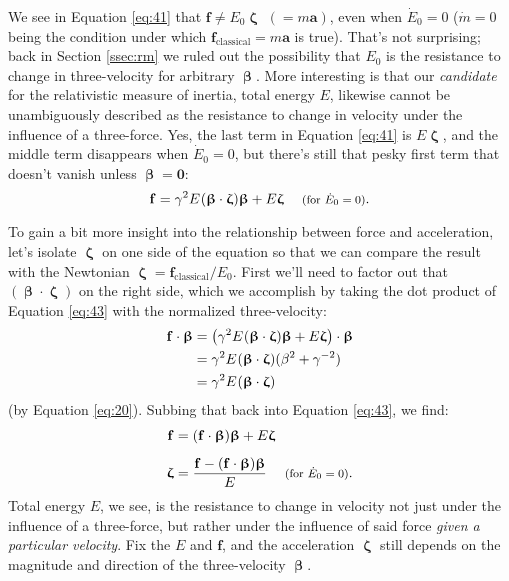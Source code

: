\documentclass[12pt]{article}
\renewcommand{\vv}[1]{\mathbf{#1}}
\newcommand{\vvbeta}{\bm{\upbeta}}
\newcommand{\vvzeta}{\bm{\upzeta}}
\begin{document}
We see in Equation \ref{eq:41} that $\vv f \neq E_0 \vvzeta$ $( = m \vv a)$, even when $\dot{E}_0 = 0$ ($\dot{m} = 0$ being the condition under which $\vv f_\textrm{classical} = m \vv a$ is true). That's not surprising; back in Section \ref{ssec:rm} we ruled out the possibility that $E_0$ is the resistance to change in three-velocity for arbitrary $\vvbeta$. More interesting is that our \emph{candidate} for the relativistic measure of inertia, total energy $E$, likewise cannot be unambiguously described as the resistance to change in velocity under the influence of a three-force. Yes, the last term in Equation \ref{eq:41} is $E \vvzeta$, and the middle term disappears when $\dot{E}_0 = 0$, but there's still that pesky first term that doesn't vanish unless $\vvbeta = \vv 0$:
\begin{equation}\label{eq:43}
\vv f = \gamma^2 E \mkern1mu (\vvbeta \cdot \vvzeta) \vvbeta + E \vvzeta \quad \textrm{\footnotesize{ (for $\dot{E}_0 = 0$)}}.
\end{equation}

To gain a bit more insight into the relationship between force and acceleration, let's isolate $\vvzeta$ on one side of the equation so that we can compare the result with the Newtonian $\vvzeta = \vv f_{\mathrm{classical}} / E_0$. First we'll need to factor out that $(\vvbeta \cdot \vvzeta)$ on the right side, which we accomplish by taking the dot product of Equation \ref{eq:43} with the normalized three-velocity:
\begin{equation*}
\begin{split}
\vv f \cdot \vvbeta &= \left( \gamma^2 E \mkern1mu (\vvbeta \cdot \vvzeta) \vvbeta + E \vvzeta \right) \cdot \vvbeta \\
&= \gamma^2 E \mkern1mu (\vvbeta \cdot \vvzeta)(\beta^2 + \gamma^{-2}) \\
&= \gamma^2 E \mkern1mu (\vvbeta \cdot \vvzeta)
\end{split}
\end{equation*}
(by Equation \ref{eq:20}). Subbing that back into Equation \ref{eq:43}, we find:
\begin{equation}\label{eq:44}
\begin{split}
\vv f &= (\vv f \cdot \vvbeta) \vvbeta + E \vvzeta \\[5pt]
\vvzeta &= \frac{\vv f - (\vv f \cdot \vvbeta) \vvbeta}{E} \quad \textrm{\footnotesize{ (for $\dot{E}_0 = 0$)}}.
\end{split}
\end{equation}
Total energy $E$, we see, is the resistance to change in velocity not just under the influence of a three-force, but rather under the influence of said force \emph{given a particular velocity}. Fix the $E$ and $\vv f$, and the acceleration $\vvzeta$ still depends on the magnitude and direction of the three-velocity $\vvbeta$.
\end{document}
